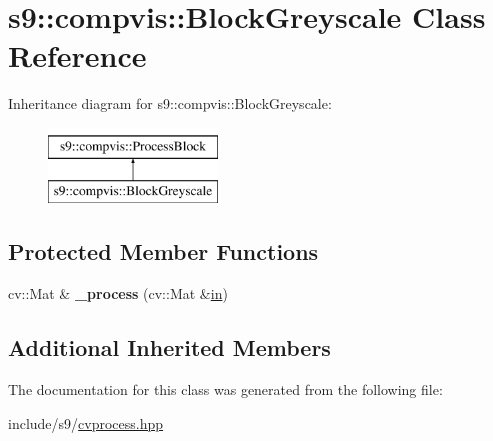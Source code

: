 \hypertarget{classs9_1_1compvis_1_1BlockGreyscale}{\section{s9\-:\-:compvis\-:\-:Block\-Greyscale Class Reference}
\label{classs9_1_1compvis_1_1BlockGreyscale}
}
Inheritance diagram for s9\-:\-:compvis\-:\-:Block\-Greyscale\-:\begin{figure}[H]
\begin{center}
\leavevmode
\includegraphics[height=2.000000cm]{classs9_1_1compvis_1_1BlockGreyscale}
\end{center}
\end{figure}
\subsection*{Protected Member Functions}
\begin{DoxyCompactItemize}
\item 
\hypertarget{classs9_1_1compvis_1_1BlockGreyscale_a54a28970664d2f1f9817797731408caf}{cv\-::\-Mat \& {\bfseries \-\_\-process} (cv\-::\-Mat \&\hyperlink{structin}{in})}\label{classs9_1_1compvis_1_1BlockGreyscale_a54a28970664d2f1f9817797731408caf}

\end{DoxyCompactItemize}
\subsection*{Additional Inherited Members}


The documentation for this class was generated from the following file\-:\begin{DoxyCompactItemize}
\item 
include/s9/\hyperlink{cvprocess_8hpp}{cvprocess.\-hpp}\end{DoxyCompactItemize}
